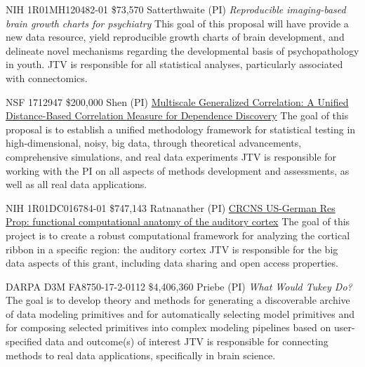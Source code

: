 \documentclass[10pt,colorlinks=true,urlcolor=blue]{moderncv}
\begin{document}
        
    {NIH 1R01MH120482-01}%
    {\$73,570} 
    {Satterthwaite (PI)}
    {\emph{Reproducible imaging-based brain growth charts for psychiatry} 
    This  goal of this proposal will have provide a new data resource, yield reproducible growth charts of brain development, and delineate novel mechanisms regarding the developmental basis of psychopathology in youth.}
    {JTV is responsible for all statistical analyses, particularly associated with connectomics.}
    {}


    {NSF 1712947}%
    {\$200,000} 
    {Shen (PI)}
    {\href{http://grantome.com/grant/NSF/DMS-1921310}%
    {Multiscale Generalized Correlation: A Unified Distance-Based Correlation Measure for Dependence Discovery} 
    The  goal of this proposal is to establish a unified methodology framework for statistical testing in high-dimensional, noisy, big data, through theoretical advancements, comprehensive simulations, and real data experiments}%
    {JTV is responsible for working with the PI on all aspects of methods development and assessments, as well as all real data applications.}
    {}


    {NIH 1R01DC016784-01}%
    {\$747,143} 
    {Ratnanather (PI)}
    {\href{http://grantome.com/grant/NIH/R01-DC016784-02}%
    {CRCNS US-German Res Prop: functional computational anatomy of the auditory cortex} 
    The goal of this project is to create a robust computational framework for analyzing the cortical ribbon in a specific region: the auditory cortex}
    {JTV is responsible for the big data aspects of this grant, including data sharing and open access properties.}
    {}


%
    {DARPA D3M FA8750-17-2-0112}%
    {\$4,406,360}%
    {Priebe (PI)}
    {\emph{What Would Tukey Do?} 
    The goal is to develop theory and methods for generating a discoverable archive of data modeling primitives and for automatically selecting model primitives and for composing selected primitives into complex modeling pipelines based on user-specified data and outcome(s) of interest}%
    {JTV is responsible for connecting methods to real data applications, specifically in brain science.}
    {}
\end{document}
